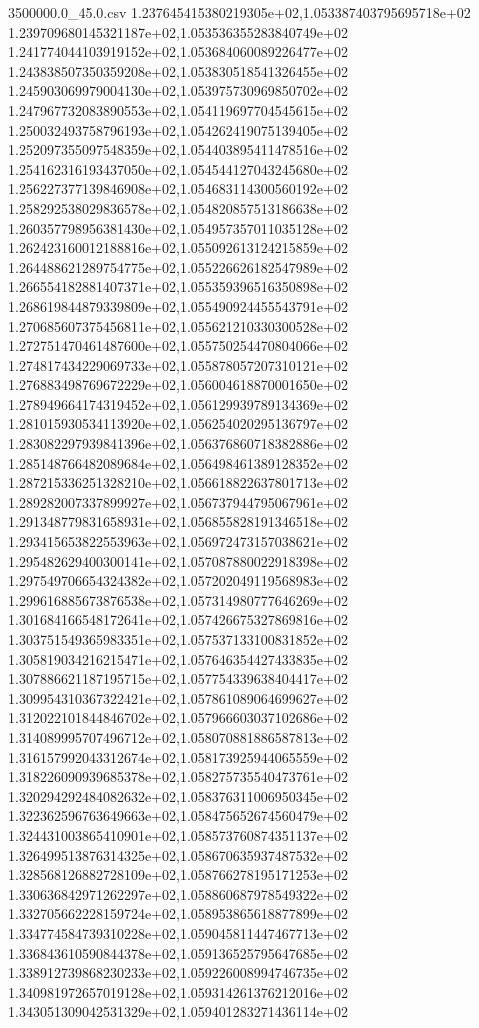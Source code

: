 \begin{filecontents*}{3500000.0_45.0.csv}
1.237645415380219305e+02,1.053387403795695718e+02
1.239709680145321187e+02,1.053536355283840749e+02
1.241774044103919152e+02,1.053684060089226477e+02
1.243838507350359208e+02,1.053830518541326455e+02
1.245903069979004130e+02,1.053975730969850702e+02
1.247967732083890553e+02,1.054119697704545615e+02
1.250032493758796193e+02,1.054262419075139405e+02
1.252097355097548359e+02,1.054403895411478516e+02
1.254162316193437050e+02,1.054544127043245680e+02
1.256227377139846908e+02,1.054683114300560192e+02
1.258292538029836578e+02,1.054820857513186638e+02
1.260357798956381430e+02,1.054957357011035128e+02
1.262423160012188816e+02,1.055092613124215859e+02
1.264488621289754775e+02,1.055226626182547989e+02
1.266554182881407371e+02,1.055359396516350898e+02
1.268619844879339809e+02,1.055490924455543791e+02
1.270685607375456811e+02,1.055621210330300528e+02
1.272751470461487600e+02,1.055750254470804066e+02
1.274817434229069733e+02,1.055878057207310121e+02
1.276883498769672229e+02,1.056004618870001650e+02
1.278949664174319452e+02,1.056129939789134369e+02
1.281015930534113920e+02,1.056254020295136797e+02
1.283082297939841396e+02,1.056376860718382886e+02
1.285148766482089684e+02,1.056498461389128352e+02
1.287215336251328210e+02,1.056618822637801713e+02
1.289282007337899927e+02,1.056737944795067961e+02
1.291348779831658931e+02,1.056855828191346518e+02
1.293415653822553963e+02,1.056972473157038621e+02
1.295482629400300141e+02,1.057087880022918398e+02
1.297549706654324382e+02,1.057202049119568983e+02
1.299616885673876538e+02,1.057314980777646269e+02
1.301684166548172641e+02,1.057426675327869816e+02
1.303751549365983351e+02,1.057537133100831852e+02
1.305819034216215471e+02,1.057646354427433835e+02
1.307886621187195715e+02,1.057754339638404417e+02
1.309954310367322421e+02,1.057861089064699627e+02
1.312022101844846702e+02,1.057966603037102686e+02
1.314089995707496712e+02,1.058070881886587813e+02
1.316157992043312674e+02,1.058173925944065559e+02
1.318226090939685378e+02,1.058275735540473761e+02
1.320294292484082632e+02,1.058376311006950345e+02
1.322362596763649663e+02,1.058475652674560479e+02
1.324431003865410901e+02,1.058573760874351137e+02
1.326499513876314325e+02,1.058670635937487532e+02
1.328568126882728109e+02,1.058766278195171253e+02
1.330636842971262297e+02,1.058860687978549322e+02
1.332705662228159724e+02,1.058953865618877899e+02
1.334774584739310228e+02,1.059045811447467713e+02
1.336843610590844378e+02,1.059136525795647685e+02
1.338912739868230233e+02,1.059226008994746735e+02
1.340981972657019128e+02,1.059314261376212016e+02
1.343051309042531329e+02,1.059401283271436114e+02

\end{filecontents*}
